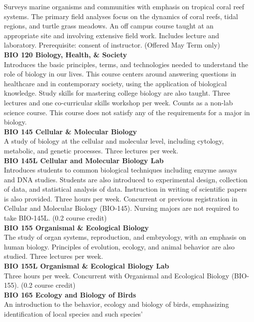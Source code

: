 \documentclass[
  letterpaper,
]{scrbook}
\begin{document}
Surveys marine organisms and communities with emphasis on tropical coral
reef systems. The primary field analyses focus on the dynamics of coral
reefs, tidal regions, and turtle grass meadows. An off campus course
taught at an appropriate site and involving extensive field work.
Includes lecture and laboratory. Prerequisite: consent of instructor.
(Offered May Term only)\\
\textbf{BIO 120 Biology, Health, \& Society}\\
Introduces the basic principles, terms, and technologies needed to
understand the role of biology in our lives. This course centers around
answering questions in healthcare and in contemporary society, using the
application of biological knowledge. Study skills for mastering college
biology are also taught. Three lectures and one co-curricular skills
workshop per week. Counts as a non-lab science course. This course does
not satisfy any of the requirements for a major in biology.\\
\textbf{BIO 145 Cellular \& Molecular Biology}\\
A study of biology at the cellular and molecular level, including
cytology, metabolic, and genetic processes. Three lectures per week.\\
\textbf{BIO 145L Cellular and Molecular Biology Lab}\\
Introduces students to common biological techniques including enzyme
assays and DNA studies. Students are also introduced to experimental
design, collection of data, and statistical analysis of data.
Instruction in writing of scientific papers is also provided. Three
hours per week. Concurrent or previous registration in Cellular and
Molecular Biology (BIO-145). Nursing majors are not required to take
BIO-145L. (0.2 course credit)\\
\textbf{BIO 155 Organismal \& Ecological Biology}\\
The study of organ systems, reproduction, and embryology, with an
emphasis on human biology. Principles of evolution, ecology, and animal
behavior are also studied. Three lectures per week.\\
\textbf{BIO 155L Organismal \& Ecological Biology Lab}\\
Three hours per week. Concurrent with Organismal and Ecological Biology
(BIO-155). (0.2 course credit)\\
\textbf{BIO 165 Ecology and Biology of Birds}\\
An introduction to the behavior, ecology and biology of birds,
emphasizing identification of local species and such species'
\end{document}

